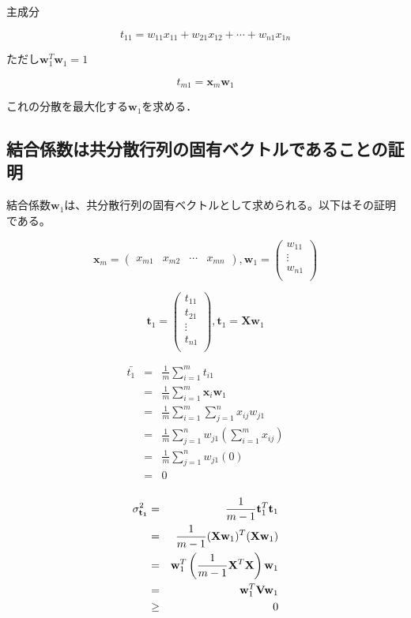 主成分

\[t_{11} = w_{11} x_{11} + w_{21} x_{12} + \cdots + w_{n1} x_{1n}\]

ただし\({\mathbf w}^T_1{\mathbf w}^{}_1 = 1\)

\[t_{m1} = {\mathbf x}_m{\mathbf w}_1\]

これの分散を最大化する\({\mathbf w}_1\)を求める．

\subsection{結合係数は共分散行列の固有ベクトルであることの証明}
結合係数\({\mathbf w}_1\)は、共分散行列の固有ベクトルとして求められる。以下はその証明である。

\[
{\mathbf x}_m
=
\left(
\begin{array}{cccc}
x_{m1} & x_{m2} & \cdots & x_{mn}
\end{array}
\right),
{\mathbf w}_1
=
\left(
\begin{array}{c}
w_{11} \\
\vdots \\
w_{n1} \\
\end{array}
\right)
\]

\[
{\mathbf t}_1
=
\left(
\begin{array}{c}
t_{11} \\
t_{21} \\
\vdots \\
t_{n1} \\
\end{array}
\right),
{\mathbf t}_1 = {\mathbf X}{\mathbf w}_1
\]

\begin{eqnarray*}
\bar{t_1} & = & \frac{1}{m}\sum^{m}_{i=1}t_{i1}\\
          & = & \frac{1}{m}\sum^{m}_{i=1}{\mathbf x}_i{\mathbf w}_1\\
          & = & \frac{1}{m}\sum^{m}_{i=1}\sum^{n}_{j=1} x_{ij} w_{j1}\\
          & = & \frac{1}{m}\sum^{n}_{j=1} w_{j1} \left( \sum^{m}_{i=1} x_{ij} \right)\\
          & = & \frac{1}{m}\sum^{n}_{j=1} w_{j1} ( 0 )\\
          & = & 0\\
\end{eqnarray*}

\begin{eqnarray*}
\sigma^2_{\bf t_1} & = & \frac{1}{m - 1}{\mathbf t}^T_1{\mathbf t}_1\\
          & = & \frac{1}{m - 1}({\mathbf X}{\mathbf w}_1)^T({\mathbf X}{\mathbf w}_1)\\
          & = & {\mathbf w}_1^T \left(\frac{1}{m - 1}{\mathbf X}^T{\mathbf X}\right){\mathbf w}_1\\
          & = & {\mathbf w}_1^T {\mathbf V} {\mathbf w}_1\\
          & \geq & 0\\ 
\end{eqnarray*}

